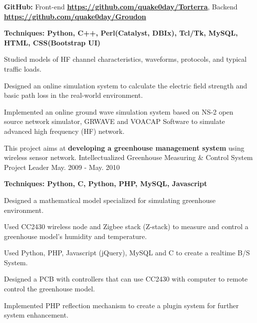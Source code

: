 \begin{cventries}
    {
      \begin{cvitems}
                        \item \textbf{GitHub:} Front-end \href{https://github.com/quake0day/Torterra}{\textbf{\underline{https://github.com/quake0day/Torterra}}}, Backend \href{https://github.com/quake0day/Groudon}{\textbf{\underline{https://github.com/quake0day/Groudon}}}
      \item \textbf{Techniques: Python, C++, Perl(Catalyst, DBIx), Tcl/Tk, MySQL, HTML, CSS(Bootstrap UI)} 
\item Studied models of HF channel characteristics, waveforms, protocols, and typical traffic loads.
\item Designed an online simulation system to calculate the electric field strength and basic path loss in the real-world environment.
\item Implemented an online ground wave simulation system based on NS-2 open source network simulator, GRWAVE and VOACAP Software to simulate advanced high frequency (HF) network.      \end{cvitems}
    }
  \cventry
    {This project aims at \textbf{developing a greenhouse management system} using wireless sensor network.}
    {Intellectualized Greenhouse Measuring \& Control System}
    {Project Leader}
    {May. 2009 - May. 2010}
    {
      \begin{cvitems}
            \item \textbf{Techniques: Python, C, Python, PHP, MySQL, Javascript} 
		\item{Designed a mathematical model specialized for simulating greenhouse environment.}
		\item{Used CC2430 wireless node and Zigbee stack (Z-stack) to measure and control a greenhouse model's humidity and temperature.}
		\item{Used Python, PHP, Javascript (jQuery), MySQL and C to create a realtime B/S System.}
		\item{Designed a PCB with controllers that can use CC2430 with computer to remote control the greenhouse model.}
		\item{Implemented PHP reflection mechanism to create a plugin system for further system enhancement.}
      \end{cvitems}
    }
\end{cventries}


